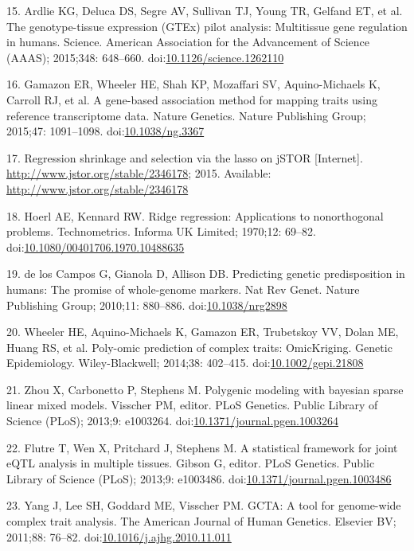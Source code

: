 \documentclass[]{article}
\begin{document}
15. Ardlie KG, Deluca DS, Segre AV, Sullivan TJ, Young TR, Gelfand ET,
et al. The genotype-tissue expression (GTEx) pilot analysis: Multitissue
gene regulation in humans. Science. American Association for the
Advancement of Science (AAAS); 2015;348: 648--660.
doi:\href{http://dx.doi.org/10.1126/science.1262110}{10.1126/science.1262110}

16. Gamazon ER, Wheeler HE, Shah KP, Mozaffari SV, Aquino-Michaels K,
Carroll RJ, et al. A gene-based association method for mapping traits
using reference transcriptome data. Nature Genetics. Nature Publishing
Group; 2015;47: 1091--1098.
doi:\href{http://dx.doi.org/10.1038/ng.3367}{10.1038/ng.3367}

17. Regression shrinkage and selection via the lasso on jSTOR
{[}Internet{]}. \url{http://www.jstor.org/stable/2346178}; 2015.
Available: \url{http://www.jstor.org/stable/2346178}

18. Hoerl AE, Kennard RW. Ridge regression: Applications to
nonorthogonal problems. Technometrics. Informa UK Limited; 1970;12:
69--82.
doi:\href{http://dx.doi.org/10.1080/00401706.1970.10488635}{10.1080/00401706.1970.10488635}

19. {de los Campos} G, Gianola D, Allison DB. Predicting genetic
predisposition in humans: The promise of whole-genome markers. Nat Rev
Genet. Nature Publishing Group; 2010;11: 880--886.
doi:\href{http://dx.doi.org/10.1038/nrg2898}{10.1038/nrg2898}

20. Wheeler HE, Aquino-Michaels K, Gamazon ER, Trubetskoy VV, Dolan ME,
Huang RS, et al. Poly-omic prediction of complex traits: OmicKriging.
Genetic Epidemiology. Wiley-Blackwell; 2014;38: 402--415.
doi:\href{http://dx.doi.org/10.1002/gepi.21808}{10.1002/gepi.21808}

21. Zhou X, Carbonetto P, Stephens M. Polygenic modeling with bayesian
sparse linear mixed models. Visscher PM, editor. PLoS Genetics. Public
Library of Science (PLoS); 2013;9: e1003264.
doi:\href{http://dx.doi.org/10.1371/journal.pgen.1003264}{10.1371/journal.pgen.1003264}

22. Flutre T, Wen X, Pritchard J, Stephens M. A statistical framework
for joint eQTL analysis in multiple tissues. Gibson G, editor. PLoS
Genetics. Public Library of Science (PLoS); 2013;9: e1003486.
doi:\href{http://dx.doi.org/10.1371/journal.pgen.1003486}{10.1371/journal.pgen.1003486}

23. Yang J, Lee SH, Goddard ME, Visscher PM. GCTA: A tool for
genome-wide complex trait analysis. The American Journal of Human
Genetics. Elsevier BV; 2011;88: 76--82.
doi:\href{http://dx.doi.org/10.1016/j.ajhg.2010.11.011}{10.1016/j.ajhg.2010.11.011}
\end{document}
